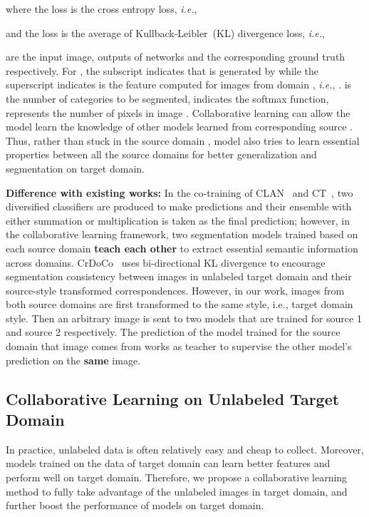 \documentclass[final]{cvpr}
\def\ie{\textit{i.e.}}
\begin{document}
where the loss  is the cross entropy loss, \ie,

and the loss  is the average of Kullback-Leibler~(KL) divergence loss, \ie,


 are the input image, outputs of networks and the corresponding ground truth respectively. For , the subscript indicates that  is generated by  while the superscript indicates  is the feature computed for images from domain , \ie, .  is the number of categories to be segmented,  indicates the softmax function,  represents the number of pixels in image . Collaborative learning can allow the model  learn the knowledge of other models  learned from corresponding source . Thus, rather than stuck in the source domain , model  also tries to learn essential properties between all the source domains for better generalization and segmentation on target domain.


\textbf{Difference with existing works:} In the co-training of CLAN~\cite{luo2019taking} and CT~\cite{qin2019generatively}, two diversified classifiers are produced to make predictions and their ensemble with either summation or multiplication is taken as the final prediction; however, in the collaborative learning framework, two segmentation models trained based on each source domain \textbf{teach each other} to extract essential semantic information across domains.
CrDoCo~\cite{chen2019crdoco} uses bi-directional KL divergence to encourage segmentation consistency between images in unlabeled target domain and their source-style transformed correspondences.  
However, in our work, images from both source domains are first transformed to the same style, i.e., target domain style. Then an arbitrary image is sent to two models that are trained for source 1 and source 2 respectively.  
The prediction of the model trained for the source domain that image comes from works as teacher to supervise the other model's prediction on the \textbf{same} image.

\subsection{Collaborative Learning on Unlabeled Target Domain}
In practice, unlabeled data is often relatively easy and cheap to collect. Moreover, models trained on the data of target domain can learn better features and perform well on target domain. Therefore, we propose a collaborative learning method to fully take advantage of the unlabeled images in target domain, and further boost the performance of models on target domain. 
\end{document}
